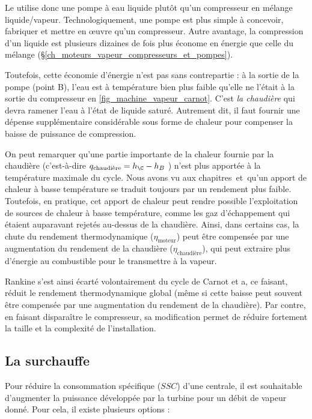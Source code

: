 		Le  utilise donc une pompe à eau liquide plutôt qu’un compresseur en mélange liquide/vapeur. Technologiquement, une pompe est plus simple à concevoir, fabriquer et mettre en œuvre qu’un compresseur. Autre avantage, la compression d’un liquide est plusieurs dizaines de fois plus économe en énergie que celle du mélange (\S\ref{ch_moteurs_vapeur_compresseurs_et_pompes}).
		
		Toutefois, cette économie d’énergie n’est pas sans contrepartie : à la sortie de la pompe (point B), l’eau est à température bien plus faible qu’elle ne l’était à la sortie du compresseur en \cref{fig_machine_vapeur_carnot}. C’est \emph{la chaudière} qui devra ramener l’eau à l’état de liquide saturé. Autrement dit, il faut fournir une dépense supplémentaire considérable sous forme de chaleur pour compenser la baisse de puissance de compression.

		On peut remarquer qu’une partie importante de la chaleur fournie par la chaudière (c’est-à-dire $q_\text{chaudière} = h_\C - h_B$ ) n’est plus apportée à la température maximale du cycle. Nous avons vu aux chapitres~\sept et~\huit qu’un apport de chaleur à basse température se traduit toujours par un rendement plus faible.\\
		Toutefois, en pratique, cet apport de chaleur peut rendre possible l’exploitation de sources de chaleur à basse température, comme les gaz d’échappement qui étaient auparavant rejetés au-dessus de la chaudière. Ainsi, dans certains cas, la chute du rendement thermodynamique ($\eta_\text{moteur}$) peut être compensée par une augmentation du rendement de la chaudière ($\eta_\text{chaudière}$), qui peut extraire plus d’énergie au combustible pour le transmettre à la vapeur.
		
		Rankine s’est ainsi écarté volontairement du cycle de Carnot et a, ce faisant, réduit le rendement thermodynamique global (même si cette baisse peut souvent être compensée par une augmentation du rendement de la chaudière). Par contre, en faisant disparaître le compresseur, sa modification permet de réduire fortement la taille et la complexité de l’installation.

		

	\subsection{La surchauffe}

		Pour réduire la consommation spécifique ($SSC$) d’une centrale, il est souhaitable d’augmenter la puissance développée par la turbine pour un débit de vapeur donné. Pour cela, il existe plusieurs options :

